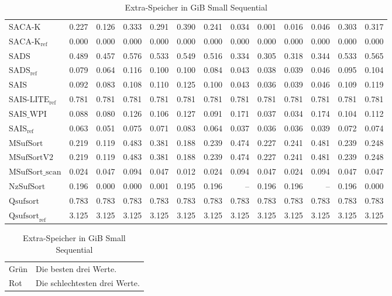 \begin{table}[h]
{\begin{tabular}{lrrrrrrrrrrrr}
    $\text{SACA-K}$ & 0.227 & 0.126 & 0.333 & 0.291 & 0.390 & 0.241 & 0.034 & 0.001 & 0.016 & 0.046 & 0.303 & 0.317 \\
    $\text{SACA-K}_{\text{ref}}$ & {\color{green!60!black}0.000} & {\color{green!60!black}0.000} & {\color{green!60!black}0.000} & {\color{green!60!black}0.000} & {\color{green!60!black}0.000} & {\color{green!60!black}0.000} & {\color{green!60!black}0.000} & {\color{green!60!black}0.000} & {\color{green!60!black}0.000} & {\color{green!60!black}0.000} & {\color{green!60!black}0.000} & {\color{green!60!black}0.000} \\
    $\text{SADS}$ & 0.489 & 0.457 & 0.576 & 0.533 & 0.549 & 0.516 & 0.334 & 0.305 & 0.318 & 0.344 & 0.533 & 0.565 \\
    $\text{SADS}_{\text{ref}}$ & 0.079 & 0.064 & 0.116 & 0.100 & 0.100 & 0.084 & 0.043 & 0.038 & 0.039 & 0.046 & 0.095 & 0.104 \\
    $\text{SAIS}$ & 0.092 & 0.083 & 0.108 & 0.110 & 0.125 & 0.100 & 0.043 & 0.036 & 0.039 & 0.046 & 0.109 & 0.119 \\
    $\text{SAIS-LITE}_{\text{ref}}$ & 0.781 & 0.781 & 0.781 & 0.781 & 0.781 & 0.781 & 0.781 & 0.781 & 0.781 & 0.781 & 0.781 & 0.781 \\
    $\text{SAIS\_WPI}$ & 0.088 & 0.080 & 0.126 & 0.106 & 0.127 & 0.091 & 0.171 & 0.037 & 0.034 & 0.174 & 0.104 & 0.112 \\
    $\text{SAIS}_{\text{ref}}$ & 0.063 & 0.051 & 0.075 & 0.071 & 0.083 & 0.064 & 0.037 & 0.036 & 0.036 & 0.039 & 0.072 & 0.074 \\
    $\text{MSufSort}$ & 0.219 & 0.119 & 0.483 & 0.381 & 0.188 & 0.239 & 0.474 & 0.227 & 0.241 & 0.481 & 0.239 & 0.248 \\
    $\text{MSufSortV2}$ & 0.219 & 0.119 & 0.483 & 0.381 & 0.188 & 0.239 & 0.474 & 0.227 & 0.241 & 0.481 & 0.239 & 0.248 \\
    $\text{MSufSort\_scan}$ & 0.024 & 0.047 & 0.094 & 0.047 & 0.012 & 0.024 & 0.094 & 0.047 & 0.024 & 0.094 & 0.047 & 0.047 \\
    $\text{NzSufSort}$ & 0.196 & {\color{green!60!black}0.000} & {\color{green!60!black}0.000} & 0.001 & 0.195 & 0.196 & {\color{darkgray}--} & 0.196 & 0.196 & {\color{darkgray}--} & 0.196 & 0.000 \\
    $\text{Qsufsort}$ & 0.783 & 0.783 & 0.783 & 0.783 & 0.783 & 0.783 & 0.783 & 0.783 & 0.783 & 0.783 & 0.783 & 0.783 \\
    $\text{Qsufsort}_{\text{ref}}$ & 3.125 & 3.125 & 3.125 & 3.125 & 3.125 & 3.125 & 3.125 & 3.125 & 3.125 & 3.125 & 3.125 & 3.125 \\
\bottomrule
\end{tabular}
}
\caption{Extra-Speicher in GiB Small Sequential}
\label{messung:tab:memory-small-seq-none}
\begin{tabular}{ll}
{\color{green}Grün} & Die besten drei Werte.\\
{\color{red}Rot} & Die schlechtesten drei Werte.\\
\end{tabular}
\end{table}
